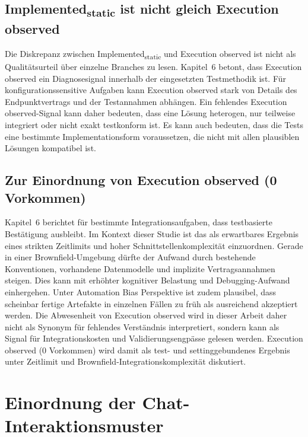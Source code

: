 \subsection{\texorpdfstring{Implemented\textsubscript{static}}{Implementedstatic} ist nicht gleich Execution observed}
\label{sec:discussion_implemented_vs_verified}

Die Diskrepanz zwischen Implemented\textsubscript{static} und Execution observed ist nicht als Qualitätsurteil über einzelne Branches zu lesen.
Kapitel~6 betont, dass Execution observed ein Diagnosesignal innerhalb der eingesetzten Testmethodik ist.
Für konfigurationssensitive Aufgaben kann Execution observed stark von Details des Endpunktvertrags und der Testannahmen abhängen.
Ein fehlendes Execution observed-Signal kann daher bedeuten, dass eine Lösung heterogen, nur teilweise integriert oder nicht exakt testkonform ist.
Es kann auch bedeuten, dass die Tests eine bestimmte Implementationsform voraussetzen, die nicht mit allen plausiblen Lösungen kompatibel ist.

\subsection{Zur Einordnung von \texorpdfstring{Execution observed (0 Vorkommen)}{Execution observed (0 Vorkommen)}}
\label{sec:discussion_verified_zero}

Kapitel~6 berichtet für bestimmte Integrationsaufgaben, dass testbasierte Bestätigung ausbleibt.
Im Kontext dieser Studie ist das als erwartbares Ergebnis eines strikten Zeitlimits und hoher Schnittstellenkomplexität einzuordnen.
Gerade in einer Brownfield-Umgebung dürfte der Aufwand durch bestehende Konventionen, vorhandene Datenmodelle und implizite Vertragsannahmen steigen.
Dies kann mit erhöhter kognitiver Belastung und Debugging-Aufwand einhergehen.
Unter Automation Bias Perspektive ist zudem plausibel, dass scheinbar fertige Artefakte in einzelnen Fällen zu früh als ausreichend akzeptiert werden.
Die Abwesenheit von Execution observed wird in dieser Arbeit daher nicht als Synonym für fehlendes Verständnis interpretiert, sondern kann als Signal für Integrationskosten und Validierungsengpässe gelesen werden.
Execution observed (0 Vorkommen) wird damit als test- und settinggebundenes Ergebnis unter Zeitlimit und Brownfield-Integrationskomplexität diskutiert.

\section{Einordnung der Chat-Interaktionsmuster}
\label{sec:discussion_chat}

